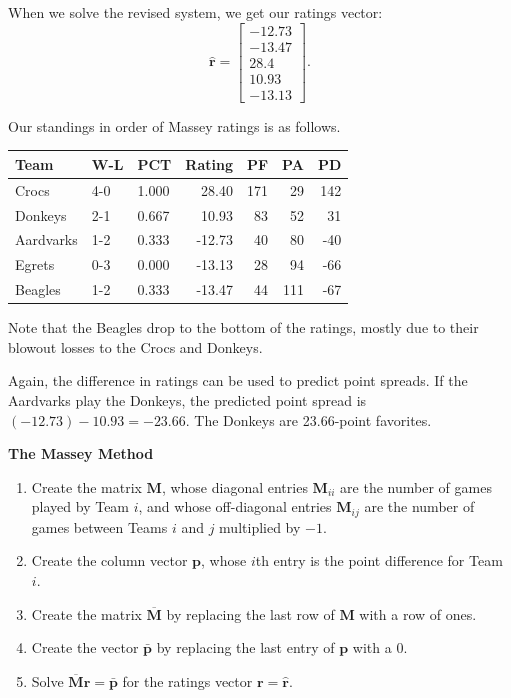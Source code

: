 \documentclass[
]{book}
\theoremstyle{definition}
\theoremstyle{definition}
\theoremstyle{definition}
\theoremstyle{definition}
\theoremstyle{remark}
\begin{document}
When we solve the revised system, we get our ratings vector:
\[\hat{\mathbf{r}}=\begin{bmatrix}-12.73\\-13.47\\28.4\\10.93\\-13.13\end{bmatrix}.\]

Our standings in order of Massey ratings is as follows.

\begin{longtable}[]{@{}lllrrrr@{}}
\toprule\noalign{}
Team & W-L & PCT & Rating & PF & PA & PD \\
\midrule\noalign{}
\endhead
\bottomrule\noalign{}
\endlastfoot
Crocs & 4-0 & 1.000 & 28.40 & 171 & 29 & 142 \\
Donkeys & 2-1 & 0.667 & 10.93 & 83 & 52 & 31 \\
Aardvarks & 1-2 & 0.333 & -12.73 & 40 & 80 & -40 \\
Egrets & 0-3 & 0.000 & -13.13 & 28 & 94 & -66 \\
Beagles & 1-2 & 0.333 & -13.47 & 44 & 111 & -67 \\
\end{longtable}

Note that the Beagles drop to the bottom of the ratings, mostly due to their blowout losses to the Crocs and Donkeys.

Again, the difference in ratings can be used to predict point spreads. If the Aardvarks play the Donkeys, the predicted point spread is \((-12.73)-10.93=-23.66\). The Donkeys are 23.66-point favorites.

\begin{propbox}

\textbf{The Massey Method}

\begin{enumerate}
\def\labelenumi{\arabic{enumi}.}
\item
  Create the matrix \(\mathbf{M}\), whose diagonal entries \(\mathbf{M}_{ii}\) are the number of games played by Team \(i\), and whose off-diagonal entries \(\mathbf{M}_{ij}\) are the number of games between Teams \(i\) and \(j\) multiplied by \(-1\).
\item
  Create the column vector \(\mathbf{p}\), whose \(i\)th entry is the point difference for Team \(i\).
\item
  Create the matrix \(\overline{\mathbf{M}}\) by replacing the last row of \(\mathbf{M}\) with a row of ones.
\item
  Create the vector \(\bar{\mathbf{p}}\) by replacing the last entry of \(\mathbf{p}\) with a 0.
\item
  Solve \(\overline{\mathbf{M}}\mathbf{r}=\bar{\mathbf{p}}\) for the ratings vector \(\mathbf{r}=\hat{\mathbf{r}}\).
\end{enumerate}

\end{propbox}
\end{document}
